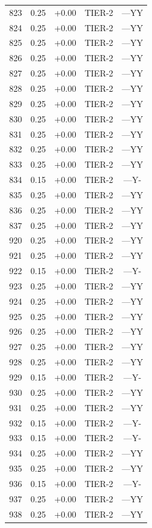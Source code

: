 \begin{longtable}{rlclc}
823 & 0.25 & +0.00 & TIER-2 & ---YY\\
824 & 0.25 & +0.00 & TIER-2 & ---YY\\
825 & 0.25 & +0.00 & TIER-2 & ---YY\\
826 & 0.25 & +0.00 & TIER-2 & ---YY\\
827 & 0.25 & +0.00 & TIER-2 & ---YY\\
828 & 0.25 & +0.00 & TIER-2 & ---YY\\
829 & 0.25 & +0.00 & TIER-2 & ---YY\\
830 & 0.25 & +0.00 & TIER-2 & ---YY\\
831 & 0.25 & +0.00 & TIER-2 & ---YY\\
832 & 0.25 & +0.00 & TIER-2 & ---YY\\
833 & 0.25 & +0.00 & TIER-2 & ---YY\\
834 & 0.15 & +0.00 & TIER-2 & ---Y-\\
835 & 0.25 & +0.00 & TIER-2 & ---YY\\
836 & 0.25 & +0.00 & TIER-2 & ---YY\\
837 & 0.25 & +0.00 & TIER-2 & ---YY\\
920 & 0.25 & +0.00 & TIER-2 & ---YY\\
921 & 0.25 & +0.00 & TIER-2 & ---YY\\
922 & 0.15 & +0.00 & TIER-2 & ---Y-\\
923 & 0.25 & +0.00 & TIER-2 & ---YY\\
924 & 0.25 & +0.00 & TIER-2 & ---YY\\
925 & 0.25 & +0.00 & TIER-2 & ---YY\\
926 & 0.25 & +0.00 & TIER-2 & ---YY\\
927 & 0.25 & +0.00 & TIER-2 & ---YY\\
928 & 0.25 & +0.00 & TIER-2 & ---YY\\
929 & 0.15 & +0.00 & TIER-2 & ---Y-\\
930 & 0.25 & +0.00 & TIER-2 & ---YY\\
931 & 0.25 & +0.00 & TIER-2 & ---YY\\
932 & 0.15 & +0.00 & TIER-2 & ---Y-\\
933 & 0.15 & +0.00 & TIER-2 & ---Y-\\
934 & 0.25 & +0.00 & TIER-2 & ---YY\\
935 & 0.25 & +0.00 & TIER-2 & ---YY\\
936 & 0.15 & +0.00 & TIER-2 & ---Y-\\
937 & 0.25 & +0.00 & TIER-2 & ---YY\\
938 & 0.25 & +0.00 & TIER-2 & ---YY\\

\end{longtable}
